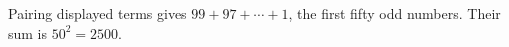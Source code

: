 Pairing displayed terms gives $99+97+\cdots+1$, the first fifty odd numbers. Their sum is $50^2=\boxed{2500}$.
